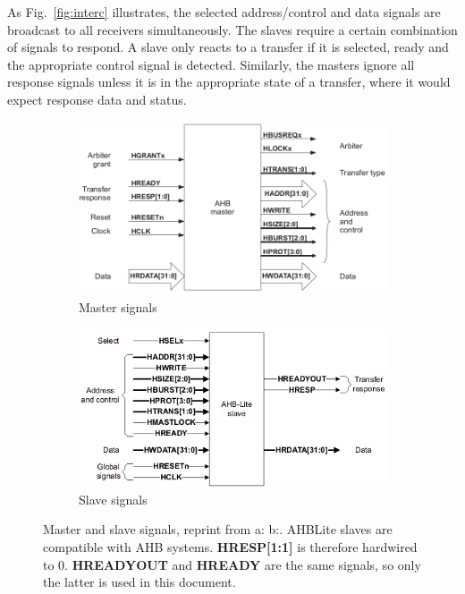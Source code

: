 As Fig.~\ref{fig:interc} illustrates, the selected address/control and data signals are broadcast to all receivers simultaneously. The slaves require a certain combination of signals to respond. A slave only reacts to a transfer if it is selected, ready and the appropriate control signal is detected. Similarly, the masters ignore all response signals unless it is in the appropriate state of a transfer, where it would expect response data and status.

\newpage

\begin{figure}[ht!]
 \centering
 \begin{subfigure}[b]{0.4\linewidth}
 \includegraphics[width=\linewidth]{figs/AHB/master_signals.png}
 \caption{Master signals}
 \end{subfigure}
 \begin{subfigure}[b]{0.4\linewidth}
 \includegraphics[width=\linewidth]{figs/AHB/slave_lite.png}
 \caption{Slave signals}
 \end{subfigure}
 \caption{Master and slave signals, reprint from a:\cite{amba} b:\cite{amba3}. AHBLite slaves are compatible with AHB systems\cite{ambacomp}. \textbf{HRESP[1:1]} is therefore hardwired to 0. \textbf{HREADYOUT} and \textbf{HREADY} are the same signals, so only the latter is used in this document.}
 \label{fig:ahbsig}
\end{figure}




